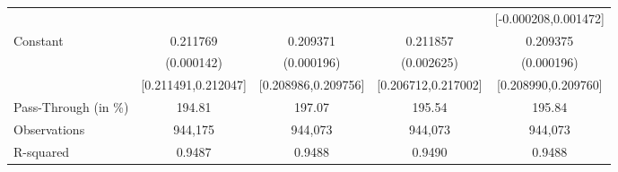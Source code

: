 {\begin{tabular}{l*{4}{c}}
                    &                     &                     &                     &[-0.000208,0.001472]         \\
Constant            &    0.211769\sym{***}&    0.209371\sym{***}&    0.211857\sym{***}&    0.209375\sym{***}\\
                    &  (0.000142)         &  (0.000196)         &  (0.002625)         &  (0.000196)         \\
                    &[0.211491,0.212047]         &[0.208986,0.209756]         &[0.206712,0.217002]         &[0.208990,0.209760]         \\
\midrule
Pass-Through (in \%)&      194.81         &      197.07         &      195.54         &      195.84         \\
Observations        &     944,175         &     944,073         &     944,073         &     944,073         \\
R-squared           &      0.9487         &      0.9488         &      0.9490         &      0.9488         \\
\bottomrule
\end{tabular}
}
